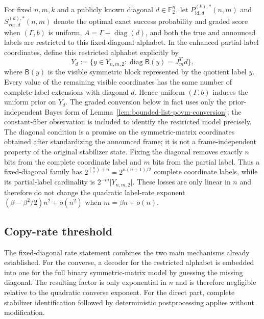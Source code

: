 \documentclass[11pt]{article}
\newcommand{\F}{\mathbb F}
\newcommand{\1}{\mathbf 1}
\theoremstyle{plain}
\theoremstyle{definition}
\theoremstyle{remark}
\begin{document}
For fixed $n,m,k$ and a publicly known diagonal $d\in\F_2^n$, let
$P_{\mathrm{id},d}^{(k),*}(n,m)$ and $S_{\mathrm{ver},d}^{(k),*}(n,m)$ denote the optimal
exact success probability and graded score when $(\Gamma,b)$ is uniform,
$A=\Gamma+\operatorname{diag}(d)$, and both the true and announced labels are
restricted to this fixed-diagonal alphabet.  In the enhanced partial-label
coordinates, define this restricted alphabet explicitly by
\begin{equation}
 Y_d:=\{y\in Y_{n,m,2}:\operatorname{diag}\mathsf B(y)=J_m^Td\},
 \label{eq:fixed-diagonal-partial-label-slice}
\end{equation}
where $\mathsf B(y)$ is the visible symmetric block represented by the quotient
label $y$.  Every value of the remaining visible coordinates has the same
number of complete-label extensions with diagonal $d$.  Hence uniform
$(\Gamma,b)$ induces the uniform prior on $Y_d$.  The graded conversion below
in fact uses only the prior-independent Bayes form of
Lemma~\ref{lem:bounded-list-povm-conversion}; the constant-fiber observation is
included to identify the restricted model precisely.  The diagonal condition
is a promise on the symmetric-matrix coordinates obtained after standardizing
the announced frame; it is not a frame-independent property of the original
stabilizer state.
Fixing the diagonal removes exactly $n$ bits from the complete coordinate label and $m$ bits from the partial label.  Thus a fixed-diagonal family has $2^{\binom n2+n}=2^{n(n+1)/2}$ complete coordinate labels, while its partial-label cardinality is $2^{-m}\lvert Y_{n,m,2}\rvert$.  These losses are only linear in $n$ and therefore do not change the quadratic label-rate exponent $(\beta-\beta^2/2)n^2+o(n^2)$ when $m=\beta n+o(n)$.

\subsection{Copy-rate threshold}
\label{subsec:fixed-diagonal-copy-rate-threshold}

The fixed-diagonal rate statement combines the two main mechanisms already
established.  For the converse, a decoder for the restricted alphabet is
embedded into one for the full binary symmetric-matrix model by guessing the
missing diagonal.  The resulting factor is only exponential in $n$ and is
therefore negligible relative to the quadratic converse exponent.  For the
direct part, complete stabilizer identification followed by deterministic
postprocessing applies without modification.
\end{document}
